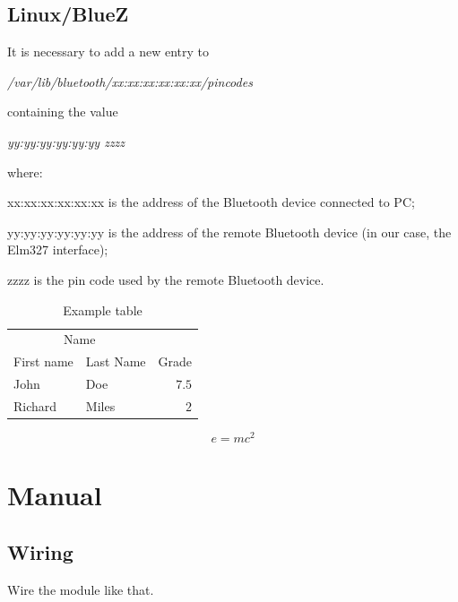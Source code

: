 \documentclass[twoside]{article}
\begin{document}
\begin{multicols}{2}
\subsection{Linux/BlueZ}

It is necessary to add a new entry to

\emph{/var/lib/bluetooth/xx:xx:xx:xx:xx:xx/pincodes}

containing the value

\emph{yy:yy:yy:yy:yy:yy zzzz}

where:
\begin{compactitem}
\item xx:xx:xx:xx:xx:xx is the address of the Bluetooth device connected to PC;
\item yy:yy:yy:yy:yy:yy is the address of the remote Bluetooth device (in our case, the Elm327 interface);
\item zzzz is the pin code used by the remote Bluetooth device.
\end{compactitem}

\begin{table}[H]
\caption{Example table}
\centering
\begin{tabular}{llr}
\toprule
\multicolumn{2}{c}{Name} \\
\cmidrule(r){1-2}
First name & Last Name & Grade \\
\midrule
John & Doe & $7.5$ \\
Richard & Miles & $2$ \\
\bottomrule
\end{tabular}
\end{table}

\lipsum[5] %

\begin{equation}
\label{eq:emc}
e = mc^2
\end{equation}

\lipsum[6] %


\section{Manual}

\subsection{Wiring}

Wire the module like that.


\end{multicols}
\end{document}
